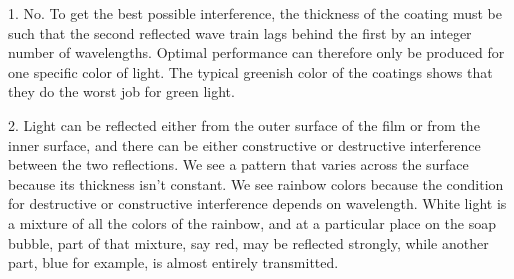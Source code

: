 1. No. To get the best possible interference, the thickness of the coating must be such
that the second reflected wave train lags behind the first by an integer number of
wavelengths. Optimal performance can therefore only be produced for one specific
color of light. The typical greenish color of the coatings shows that
they do the worst job for green light.

2. Light can be reflected either from the outer surface of the film or from the
inner surface, and there can be either constructive or destructive interference
between the two reflections. We see a pattern that varies across the surface because
its thickness isn't constant. We see rainbow colors because the condition for
destructive or constructive interference depends on wavelength. White light is
a mixture of all the colors of the rainbow, and at a particular place on the
soap bubble, part of that mixture, say red, may be reflected strongly, while
another part, blue for example, is almost entirely transmitted.



